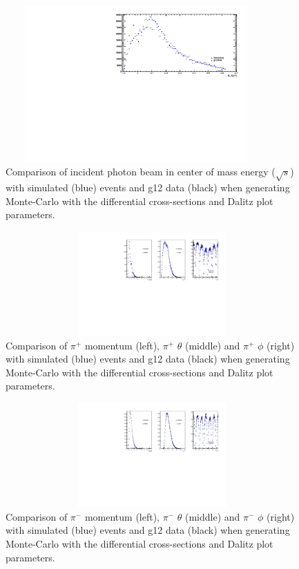 \begin{figure}[ht!]
\centerline{
\includegraphics[width=10cm,height=6cm]{w.pdf}}
\caption{Comparison of incident photon beam in center of mass energy ($\sqrt{s}$) with simulated (blue) events and g12 data (black) when generating Monte-Carlo with the differential cross-sections and Dalitz plot parameters.}
\label{fig6}
\end{figure}

\begin{figure}[ht!]
\centerline{
\includegraphics[width=14cm,height=4cm]{Pip.pdf}}
\caption{Comparison of  $\pi^{+}$ momentum (left), $\pi^{+}$ $\theta$ (middle) and $\pi^{+}$ $\phi$ (right) with simulated (blue) events and g12 data (black) when generating Monte-Carlo with the differential cross-sections and Dalitz plot parameters.}
\label{fig7}
\end{figure}
 
\begin{figure}[ht!]
\centerline{
\includegraphics[width=14cm,height=4cm]{Pim.pdf}}
\caption{Comparison of $\pi^{-}$ momentum (left), $\pi^{-}$ $\theta$ (middle) and $\pi^{-}$ $\phi$ (right) with simulated (blue) events and g12 data (black) when generating Monte-Carlo with the differential cross-sections and Dalitz plot parameters.}
\label{fig8}
\end{figure}


